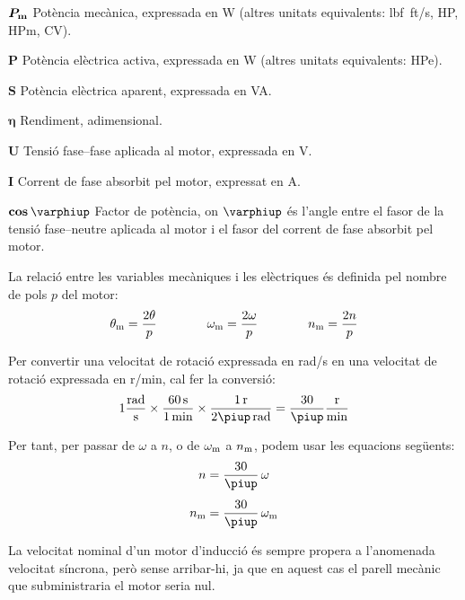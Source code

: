 \begin{list}{}
   \item[$\boldsymbol{P_\mathrm{m}}$] Potència mecànica, expressada en \si{W} (altres unitats equivalents: \si{lbf.ft/s}, \si{HP},  \si{HPm}, \si{CV}).
   \item[$\boldsymbol{P}$] Potència elèctrica activa, expressada en \si{W} (altres unitats equivalents: \si{HPe}).
   \item[$\boldsymbol{S}$] Potència elèctrica aparent, expressada en \si{VA}.
   \item[$\boldsymbol{\eta}$] Rendiment, adimensional.
   \item[$\boldsymbol{U}$] Tensió fase--fase aplicada al motor, expressada en \si{V}.
   \item[$\boldsymbol{I}$] Corrent de fase absorbit pel motor, expressat en \si{A}.
   \item[$\boldsymbol{\cos\varphiup}$] Factor de potència, on $\varphiup$ és l'angle entre el fasor de la tensió fase--neutre aplicada al motor i el fasor del corrent de fase absorbit pel motor.
\end{list}

La relació entre les variables mecàniques i les elèctriques és definida pel nombre de pols $p$ del motor:
\begin{equation}\label{eq:vel-ele-mec}
    \theta_\mathrm{m} = \frac{2\theta}{p} \qquad\qquad
    \omega_\mathrm{m} = \frac{2\omega}{p} \qquad\qquad
    n_\mathrm{m} = \frac{2n}{p}
\end{equation}

Per  convertir una velocitat de rotació expressada en \si{rad/s} en una velocitat de rotació expressada en \si{r/min}, cal fer la conversió:
\begin{equation}
 1\frac{\si{rad}}{\si{s}} \times \frac{\SI{60}{s}}{\SI{1}{min}} \times \frac{\SI{1}{r}}{2\piup\,\si{rad}} = \frac{30}{\piup}\frac{\si{r}}{\si{min}}
 \end{equation}

 Per tant, per passar de $\omega$ a $n$, o de $\omega_\mathrm{m}$ a $n_\mathrm{m}$, podem usar les equacions següents:
\begin{subequations}\index{motors d'inducció!velocitat}
\begin{align}
    n        &= \frac{30}{\piup} \,\omega \\[1ex]
    n\ped{m} &= \frac{30}{\piup} \,\omega\ped{m}
\end{align}
\end{subequations}

La velocitat nominal d'un motor d'inducció és sempre propera a l'anomenada velocitat síncrona, però sense arribar-hi, ja que en aquest cas el parell mecànic que subministraria el motor seria nul.

